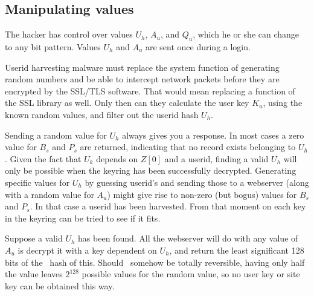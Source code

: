 \subsection{Manipulating values}
\label{sec:manipulating_values}
The hacker has control over values $U_h$, $A_u$, and $Q_u$, which he or she can change to any bit pattern.
Values $U_h$ and $A_u$ are sent once during a login.
\par
Userid harvesting malware must replace the system function of generating random numbers
and be able to intercept network packets before they are encrypted by the SSL/TLS software.
That would mean replacing a function of the SSL library as well.
Only then can they calculate the user key $K_u$,
using the known random values,
and filter out the userid hash $U_h$.
\par
Sending a random value for $U_h$ always gives you a response.
In most cases a zero value for $B_s$ and $P_s$ are returned,
indicating that no record exists belonging to $U_h$.
Given the fact that $U_k$ depends on $Z[0]$ and a userid,
finding a valid $U_h$ will only be possible when the keyring
has been successfully decrypted.
Generating specific values for $U_h$ by guessing userid's and sending those to a webserver
(along with a random value for $A_u$)
might give rise to non-zero
(but bogus)
values for $B_s$ and $P_s$.
In that case a userid has been harvested.
From that moment on each key in the keyring can be tried to see if it fits.
\par
Suppose a valid $U_h$ has been found.
All the webserver will do with any value of $A_u$ is decrypt it with a key dependent on $U_h$,
and return the least significant 128 bits of the \SHA\ hash of this.
Should \SHA\ somehow be totally reversible,
having only half the value leaves $2^{128}$ possible values for the random value,
so no user key or site key can be obtained this way.

